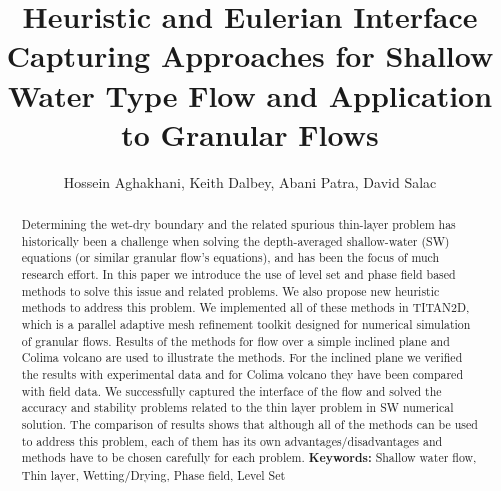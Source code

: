 \documentclass[letterpaper,10pt]{article}
\title{Heuristic and Eulerian Interface Capturing Approaches for Shallow Water Type Flow and Application to Granular Flows }
\author{Hossein Aghakhani, Keith Dalbey, Abani Patra, David Salac}
\date{}
\begin{document}
\maketitle
\begin {abstract}{
Determining the wet-dry boundary and the related spurious thin-layer problem has historically been a challenge when 
solving the depth-averaged shallow-water (SW) equations (or similar granular flow's equations), and has 
been the focus of much research effort. In this paper we introduce the use of level set and phase field based methods to solve this issue and related problems. We also propose new heuristic 
methods to address this problem. We implemented all of these methods in TITAN2D, which is a parallel adaptive mesh refinement toolkit designed for numerical simulation of granular flows. 
Results of the methods for flow over a simple inclined plane and Colima volcano are used to illustrate the methods. For the inclined plane we verified the results with experimental data and for 
Colima volcano they have been compared with field data. We successfully captured the interface of the flow and solved the accuracy and stability problems related to the thin layer problem in 
SW numerical solution. The comparison of results shows that although all of the methods can be used to address this problem, 
each of them has its own advantages/disadvantages and methods have to be chosen carefully for each problem.
\textbf{Keywords:} Shallow water flow, Thin layer, Wetting/Drying, Phase field, Level Set}
\end{abstract}
\end{document}
